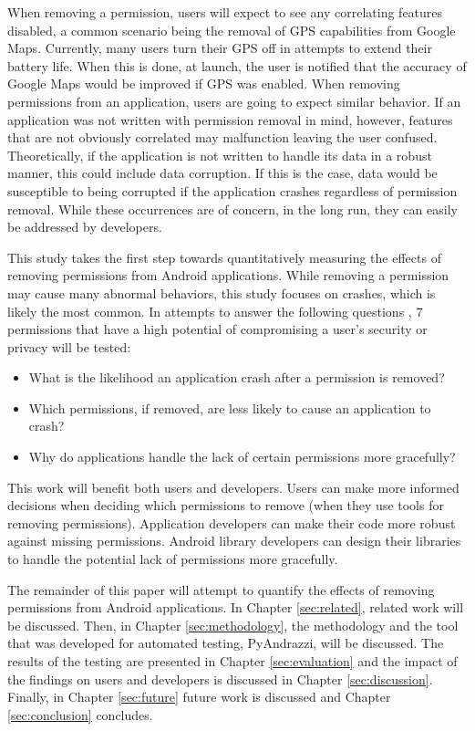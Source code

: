When removing a permission, users will expect to see any correlating features disabled, a common scenario being the removal of GPS capabilities from Google Maps.  Currently, many users turn their GPS off in attempts to extend their battery life.  When this is done, at launch, the user is notified that the accuracy of Google Maps would be improved if GPS was enabled.  When removing permissions from an application, users are going to expect similar behavior.  If an application was not written with permission removal in mind, however, features that are not obviously correlated may malfunction leaving the user confused.  Theoretically, if the application is not written to handle its data in a robust manner, this could include data corruption.  If this is the case, data would be susceptible to being corrupted if the application crashes regardless of permission removal.  While these occurrences are of concern, in the long run, they can easily be addressed by developers.  

This study takes the first step towards quantitatively measuring the effects of removing permissions from Android applications.  While removing a permission may cause many abnormal behaviors, this study focuses on crashes, which is likely the most common.  In attempts to answer the following questions , 7 permissions that have a high potential of compromising a user's security or privacy will be tested:

\begin{itemize}
\item What is the likelihood an application crash after a permission is removed?

\item Which permissions, if removed, are less likely to cause an application to crash?

\item Why do applications handle the lack of certain permissions more gracefully?

\end{itemize}

This work will benefit both users and developers.  Users can make more informed decisions when deciding which permissions to remove (when they use tools for removing permissions).  Application developers can make their code more robust against missing permissions.  Android library developers can design their libraries to handle the potential lack of permissions more gracefully.  
	
The remainder of this paper will attempt to quantify the effects of removing permissions from Android applications.  In Chapter \ref{sec:related}, related work will be discussed.  Then, in Chapter \ref{sec:methodology}, the methodology and the tool that was developed for automated testing, PyAndrazzi, will be discussed.  The results of the testing are presented in Chapter \ref{sec:evaluation} and the impact of the findings on users and developers is discussed in Chapter \ref{sec:discussion}.  Finally, in Chapter \ref{sec:future} future work is discussed and Chapter \ref{sec:conclusion} concludes.  